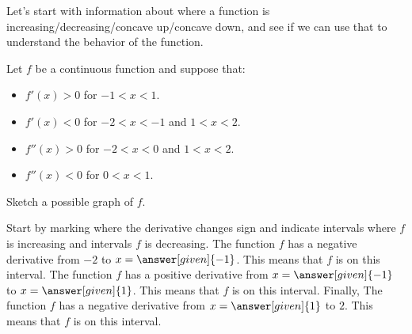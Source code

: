 \documentclass{ximera}
\begin{document}
Let's start with information about where a function is increasing/decreasing/concave up/concave down, and see if we can use that to understand
the behavior of the function.
\begin{example}
  Let $f$ be a continuous function and suppose that:
  \begin{itemize}
  \item $f'(x) > 0$ for $-1< x<1$.
  \item $f'(x) < 0$ for $-2< x<-1$ and $1<x<2$.
  \item $f''(x) > 0$ for $-2<x<0$ and $1<x< 2$.
  \item $f''(x) < 0$ for $0<x< 1$.  
  \end{itemize}
  Sketch a possible graph of $f$.
  \begin{explanation}
    Start by marking where the derivative changes sign and indicate
    intervals where $f$ is increasing and intervals $f$ is
    decreasing. The function $f$ has a negative derivative from $-2$
    to $x=\answer[given]{-1}$. This means that $f$ is
     on
    this interval. The function $f$ has a positive derivative from
    $x=\answer[given]{-1}$ to $x=\answer[given]{1}$. This means that
    $f$ is
     on
    this interval. Finally, The function $f$ has a negative derivative
    from $x=\answer[given]{1}$ to $2$. This means that $f$ is
     on
    this interval.
  \begin{image}
\end{image}
\end{explanation}
\end{example}
\end{document}
